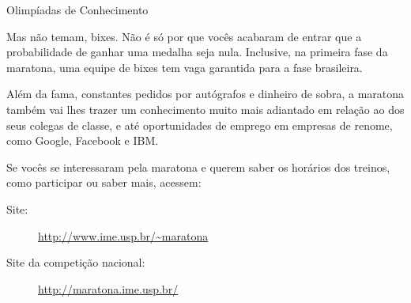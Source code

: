 \begin{subsecao}{Olimpíadas de Conhecimento}
\begin{itemize}
Mas não temam, bixes. Não é só por que vocês acabaram de entrar que
a probabilidade de ganhar uma medalha seja nula. Inclusive, na primeira
fase da maratona, uma equipe de bixes tem vaga garantida para a
fase brasileira.

Além da fama, constantes pedidos por autógrafos e dinheiro de sobra,
a maratona também vai lhes trazer um conhecimento muito mais
adiantado em relação ao dos seus colegas de classe, e até oportunidades
de emprego em empresas de renome, como Google, Facebook e IBM.

Se vocês se interessaram pela maratona e querem saber os horários dos
treinos, como participar ou saber mais, acessem:

\begin{description}
  \item[Site:] \url{http://www.ime.usp.br/~maratona}
  \item[Site da competição nacional:] \url{http://maratona.ime.usp.br/}
\end{description}

\end{itemize}


\end{subsecao}
